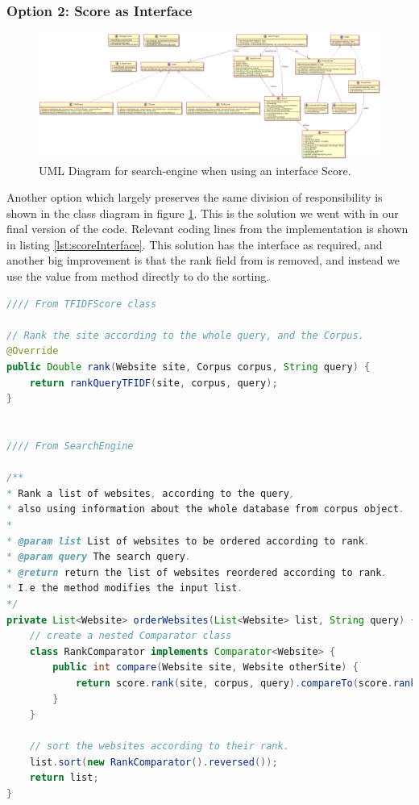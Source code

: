 \subsubsection{Option 2: Score as Interface}
\begin{figure}
	\centering
	\includegraphics[width=\textwidth]{graphics/uml/ScoreAsInterface.png}
	\caption{UML Diagram for search-engine when using an interface Score.}
	\label{fig:uml:ScoreAsInterface}
\end{figure}
Another option which largely preserves the same division of responsibility is shown in the class diagram in figure \ref{fig:uml:ScoreAsInterface}. This is the solution we went with in our final version of the code. Relevant coding lines from the implementation is shown in listing \ref{lst:scoreInterface}.
This solution has the  interface as required, and another big improvement is that the rank field from  is removed, and instead we use the value from  method directly to do the sorting.  


\begin{lstlisting}[language={Java}, caption={Final implementation where Score is an interface.}, label={lst:scoreInterface}]
//// From TFIDFScore class 

// Rank the site according to the whole query, and the Corpus.
@Override
public Double rank(Website site, Corpus corpus, String query) {
	return rankQueryTFIDF(site, corpus, query);
}


//// From SearchEngine 

/**
* Rank a list of websites, according to the query, 
* also using information about the whole database from corpus object. 
*
* @param list List of websites to be ordered according to rank.
* @param query The search query.
* @return return the list of websites reordered according to rank.
* I.e the method modifies the input list.  
*/
private List<Website> orderWebsites(List<Website> list, String query) {
	// create a nested Comparator class
	class RankComparator implements Comparator<Website> {
		public int compare(Website site, Website otherSite) {
			return score.rank(site, corpus, query).compareTo(score.rank(otherSite, corpus, query));
		}
	}

	// sort the websites according to their rank.
	list.sort(new RankComparator().reversed());     
	return list;
}
\end{lstlisting}



